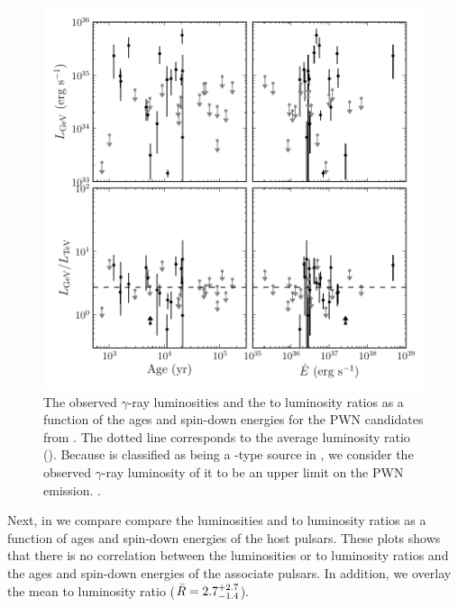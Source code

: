 \begin{figure}[htbp]
  \centering
  \includegraphics{chapters/population_study/figures/pwn_age_edot_vs_l_gev.pdf}
  \caption{The observed $\gamma$-ray luminosities and the
  \gev to \tev luminosity ratios as a function of the ages
  and spin-down energies for the \ac{PWN} candidates 
  from .  The dotted line
  corresponds to the average luminosity ratio (\MeanLuminosityRatio).
  Because  is classified as being a \PSRClass-type
  source in , we consider the observed $\gamma$-ray
  luminosity of it to be an upper limit on the \ac{PWN} emission.
  .}
\end{figure}

Next, in  we compare compare the \gev
luminosities and \gev to \tev luminosity ratios as a function of ages
and spin-down energies of the host pulsars.  These plots shows that
there is no correlation between the \gev luminosities or \gev to \tev
luminosity ratios and the ages and spin-down energies of the associate
pulsars.  In addition, we overlay the mean \gev to \tev luminosity ratio
($\bar{R}=2.7_{-1.4}^{+2.7}$).

